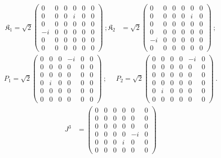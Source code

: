 \documentclass[journal,article,submit,pdftex,moreauthors]{Definitions/mdpi}
\begin{document}
    \begin{align}
        \mathfrak{K}_1=\sqrt{2}\begin{pmatrix}
    0&0&0&0&0&0\\
    0&0&0&i&0&0\\
    0&0&0&0&0&0\\
    -i&0&0&0&0&0\\
    0&0&0&0&0&0\\
    0&0&0&0&0&0
    \end{pmatrix}~;
    \mathfrak{K}_2&=\sqrt{2}\begin{pmatrix}
    0&0&0&0&0&0\\
    0&0&0&0&i&0\\
    0&0&0&0&0&0\\
    0&0&0&0&0&0\\
    -i&0&0&0&0&0\\
    0&0&0&0&0&0
    \end{pmatrix}~;\nonumber
    \end{align}
    \begin{align}
        P_1=\sqrt{2}\begin{pmatrix}
    0&0&0&-i&0&0\\
    0&0&0&0&0&0\\
    0&0&0&0&0&0\\
    0&i&0&0&0&0\\
    0&0&0&0&0&0\\
    0&0&0&0&0&0
    \end{pmatrix}~;~~~~~~
    P_2=\sqrt{2}\begin{pmatrix}
    0&0&0&0&-i&0\\
    0&0&0&0&0&0\\
    0&0&0&0&0&0\\
    0&0&0&0&0&0\\
    0&i&0&0&0&0\\
    0&0&0&0&0&0
    \end{pmatrix}~.\nonumber
    \end{align}
    \begin{align}
        J^3&=\begin{pmatrix}
    0&0&0&0&0&0\\
    0&0&0&0&0&0\\
    0&0&0&0&0&0\\
  0&0&0&0 & -i & 0\\
  0&0&0&i & 0 & 0\\
  0&0&0&0 & 0 & 0
\end{pmatrix}\label{matrix-rep-conformal-generators}
    \end{align}
%
\end{document}
